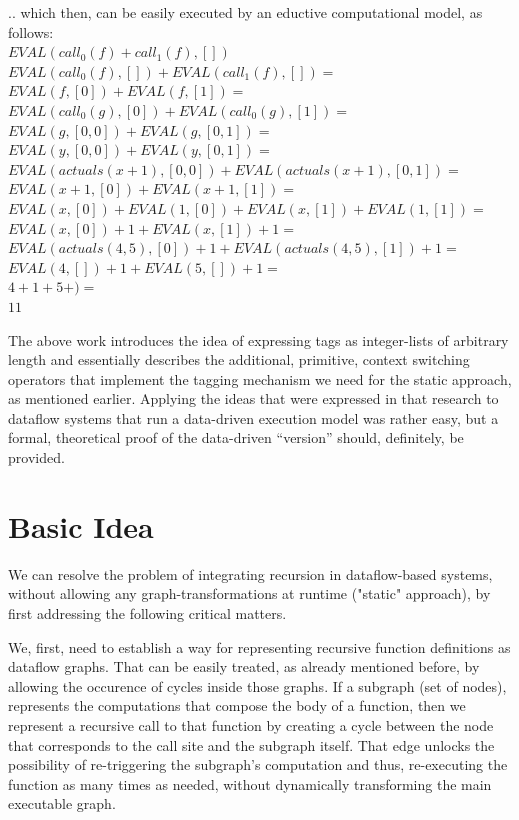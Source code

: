 \documentclass[ack,preface]{dithesis}
\begin{document}
\begin{flushleft}
.. which then, can be easily executed by an eductive computational model, as follows:\\
 \setlength{\parindent}{15ex} $EVAL(call_0(f)+call_1(f), [])$ \\
$EVAL(call_0(f), []) + EVAL(call_1(f), []) =$ \\ 
$EVAL(f, [0]) + EVAL(f, [1]) =$ \\ 
$EVAL(call_0(g), [0]) + EVAL(call_0(g), [1]) =$ \\ 
$EVAL(g, [0,0]) + EVAL(g, [0,1]) =$ \\ 
$EVAL(y, [0,0]) + EVAL(y, [0,1]) =$ \\ 
$EVAL(actuals(x+1), [0,0]) + EVAL(actuals(x+1), [0,1]) =$ \\ 
$EVAL(x+1, [0]) + EVAL(x+1, [1]) =$ \\ 
$EVAL(x, [0]) + EVAL(1, [0]) + EVAL(x, [1]) + EVAL(1, [1]) =$ \\ 
$EVAL(x, [0]) + 1 + EVAL(x, [1]) + 1 =$ \\
$EVAL(actuals(4,5), [0]) + 1 + EVAL(actuals(4,5), [1]) + 1 =$ \\
$EVAL(4, []) + 1 + EVAL(5, []) + 1 =$ \\
$4+1+5+ ) =$ \\
$11$ \\
\end{flushleft}



The above work introduces the idea of expressing tags as integer-lists of arbitrary length and essentially describes the additional, primitive, context switching operators that implement the tagging mechanism we need for the static approach, as mentioned earlier. Applying the ideas that were expressed in that research to dataflow systems that run a data-driven execution model was rather easy, but a formal, theoretical proof of the data-driven “version” should, definitely, be provided.

    \section{Basic Idea}
We can resolve the problem of integrating recursion in dataflow-based systems, without allowing any graph-transformations at runtime ("static" approach), by first addressing the following critical matters.

We, first, need to establish a way for representing recursive function definitions as dataflow graphs.  That can be easily treated, as already mentioned before, by allowing the occurence of cycles inside those graphs. If a subgraph (set of nodes), represents the computations that compose the body of a function, then we represent a recursive call to that function by creating a cycle between the node that corresponds to the call site and the subgraph itself. That edge unlocks the possibility of  re-triggering the subgraph's computation and thus, re-executing the function as many times as needed, without dynamically transforming the main executable graph.
\end{document}
